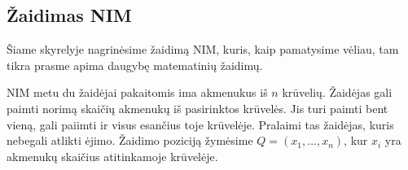 \begin{enumerate}
\end{enumerate}


\newpage
\subsection{Žaidimas NIM}

Šiame skyrelyje nagrinėsime žaidimą NIM, kuris, kaip pamatysime vėliau, tam
tikra prasme apima daugybę matematinių žaidimų.

\begin{api}
  NIM metu du žaidėjai pakaitomis ima akmenukus iš $n$ krūvelių. Žaidėjas
  gali paimti norimą skaičių akmenukų iš pasirinktos krūvelės. Jis turi
  paimti bent vieną, gali paiimti ir visus esančius toje krūvelėje.
  Pralaimi tas žaidėjas, kuris nebegali atlikti ėjimo. Žaidimo poziciją
  žymėsime $Q=(x_{1},\ldots,x_{n})$, kur $x_{i}$ yra akmenukų skaičius
  atitinkamoje krūvelėje. 
\end{api}

